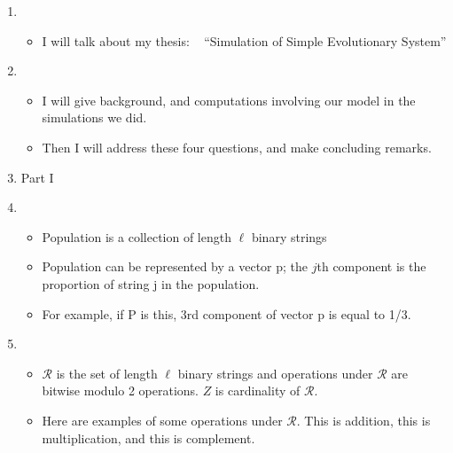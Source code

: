 \documentclass{article}
\begin{document}
\setcounter{page}{1}    
\newlength{\mywidth}
\setlength{\mywidth}{0.9\linewidth}
\newlength{\myheight}
\setlength{\myheight}{0.5in}
    
\begin{enumerate}
\item
  \begin{itemize}
  \item I will talk about my thesis: \hfill\mbox{ }\linebreak
      ``Simulation of Simple Evolutionary System'' 
  \end{itemize}  
    
\item
  \begin{itemize}
  \item      
      I will give background, and computations involving our model in the simulations we did. 
  \item
      Then I will address these four questions, and make
      concluding remarks.    
  \end{itemize}
  
\item Part I
  
\item
  \begin{itemize}
  \item Population is a collection of length $\ell$ binary strings 
  \item Population can be represented by a vector p; the $j$th component
      is the proportion of string j in the population.
  \item For example, if P is this, 3rd component of vector p is equal to 1/3.    
  \end{itemize}
  
\item
  \begin{itemize}
    \item $\mathcal{R}$ is the set of length $\ell$ binary strings and operations under $\mathcal{R}$ are bitwise modulo 2 operations. 
    $Z$ is cardinality of $\mathcal{R}$.
    \item Here are examples of some operations under $\mathcal{R}$. This is addition, this is multiplication, and this is complement.
  \end{itemize}
    

\end{enumerate}
\end{document}
